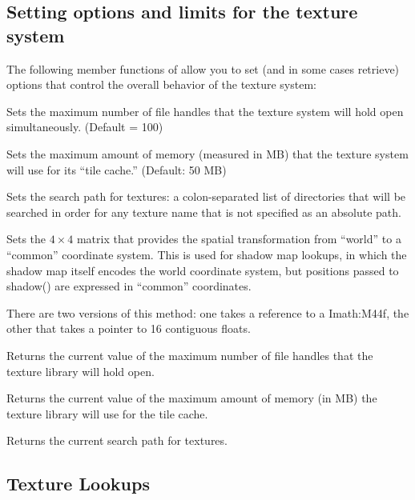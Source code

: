\subsection{Setting options and limits for the texture system}
\label{sec:texturesys:api:options}

The following member functions of \TextureSystem allow you to set
(and in some cases retrieve) options that control the overall
behavior of the texture system:

Sets the maximum number of file handles that the texture system will
hold open simultaneously.  (Default = 100)
\apiend

Sets the maximum amount of memory (measured in MB) that the texture
system will use for its ``tile cache.'' (Default: 50 MB)
\apiend

Sets the search path for textures: a colon-separated list of
directories that will be searched in order for any texture name
that is not specified as an absolute path.
\apiend

Sets the $4 \times 4$ matrix that provides the spatial transformation
from ``world'' to a ``common'' coordinate system.  This is used for
shadow map lookups, in which the shadow map itself encodes the
world coordinate system, but positions passed to {\cf shadow()} are
expressed in ``common'' coordinates.

There are two versions of this method: one takes a reference to
a {\cf Imath:M44f}, the other that takes a pointer to 16 contiguous
floats.
\apiend

Returns the current value of the maximum number of file handles that
the texture library will hold open.
\apiend

Returns the current value of the maximum amount of memory (in MB)
the texture library will use for the tile cache.
\apiend

Returns the current search path for textures.
\apiend

\newpage
\subsection{Texture Lookups}
\label{sec:texturesys:api:texture}

